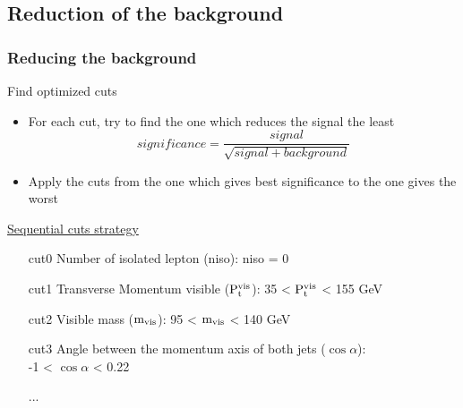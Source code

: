 \documentclass{beamer}
\begin{document}
  \subsection{Reduction of the background}
\begin{frame}
  \frametitle{Reducing the background}
    
  \vspace{-0.25cm}
  \begin{block}{Find optimized cuts}
      \begin{itemize}
          \item For each cut, try to find the one which reduces the signal the least
              \[significance = \frac{signal}{\sqrt{signal + background}}\]
          \item Apply the cuts from the one which gives best significance to the one gives the worst
      \end{itemize}
  \end{block}

  \vspace{-0.2cm}
  \begin{exampleblock}{\hyperlink{cuts}{Sequential cuts strategy}}
      \begin{enumerate}
          \item [cut0] Number of isolated lepton (niso): niso = 0 %
          \item [cut1] Transverse Momentum visible ($\rm{P_{t}^{vis}}$): 35 < $\rm{P_{t}^{vis}}$ < 155 GeV
          \item [cut2] Visible mass ($\rm{m_{vis}}$): 95 < $\rm{m_{vis}}$ < 140 GeV
          \item [cut3] Angle between the momentum axis of both jets ($\cos{\alpha}$):\\ -1 < $\cos{\alpha}$ < 0.22
          \vspace{-0.1cm}
          \item [...]
      \end{enumerate}
  \end{exampleblock}

\end{frame}
\end{document}
